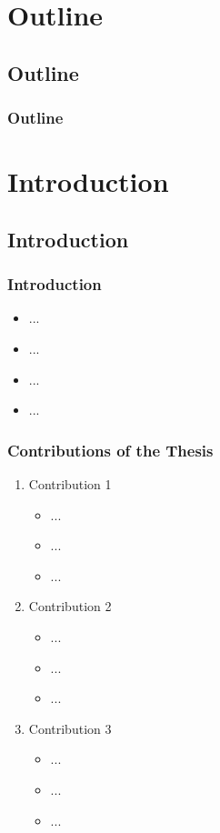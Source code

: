\documentclass[a4paper]{beamer}
\author[\FirstNameAbbreviated. \LastName]{\FirstName{} \LastName}
\title{\DissertationTitle}
\institute[\FacultyAndUniversityAbbr]{\Department\\ \Faculty\\ \University}
\date{\today}
\begin{document}
\begin{frame}
\titlepage
\end{frame}

\section{Outline}
\subsection*{Outline}
\begin{frame}[allowframebreaks]
\frametitle{Outline}
\tableofcontents
\end{frame}

\section{Introduction}
\subsection*{Introduction}
\begin{frame}
\frametitle{Introduction}
\begin{itemize}
\item ...
\item ...
\item ...
\item ...
\end{itemize}
\end{frame}

\begin{frame}
\frametitle{Contributions of the Thesis}
\begin{enumerate}
\item Contribution 1
\begin{itemize}
\item ...
\item ...
\item ...
\end{itemize}
\vspace*{.5cm}
\item Contribution 2
\begin{itemize}
\item ...
\item ...
\item ...
\end{itemize}
\vspace*{.5cm}
\item Contribution 3
\begin{itemize}
\item ...
\item ...
\item ...
\end{itemize}
\end{enumerate}
\end{frame}
\end{document}
